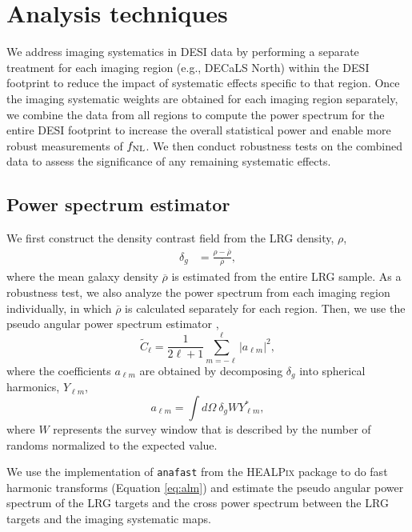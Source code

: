 \section{Analysis techniques}
\label{sec:method} 
We address imaging systematics in DESI data by performing a separate treatment for each imaging region (e.g., DECaLS North) within the DESI footprint to reduce the impact of systematic effects specific to that region. Once the imaging systematic weights are obtained for each imaging region separately, we combine the data from all regions to compute the power spectrum for the entire DESI footprint to increase the overall statistical power and enable more robust measurements of $f_{\rm NL}$. We then conduct robustness tests on the combined data to assess the significance of any remaining systematic effects.


\subsection{Power spectrum estimator}
We first construct the density contrast field from the LRG density, $\rho$,
\begin{align}\label{eq:delta}
    \delta_{g} &= \frac{\rho- \overline{\rho}}{\overline{\rho}},
\end{align}
where the mean galaxy density $\overline{\rho}$ is estimated from the entire LRG sample. As a robustness test, we also analyze the power spectrum from each imaging region individually, in which $\overline{\rho}$ is calculated separately for each region. Then, we use the pseudo angular power spectrum estimator \citep{hivon2002master},
\begin{equation}\label{eq:pusedocell}
        \tilde{C}_{\ell} = \frac{1}{2\ell +1} \sum_{m=-\ell}^{\ell} |a_{\ell m}|^{2},
\end{equation}
where the coefficients $a_{\ell m}$ are obtained by decomposing $\delta_{g}$ into spherical harmonics, $Y_{\ell m}$,
\begin{equation}\label{eq:alm}
        a_{\ell m} = \int d\Omega ~ \delta_{g} W Y^{*}_{\ell m},
\end{equation}
where $W$ represents the survey window that is described by the number of randoms normalized to the expected value.

We use the implementation of \texttt{anafast} from the \textsc{HEALPix} package \citep{gorski2005healpix} to do fast harmonic transforms (Equation \ref{eq:alm}) and estimate the pseudo angular power spectrum of the LRG targets and the cross power spectrum between the LRG targets and the imaging systematic maps.

